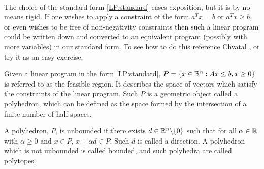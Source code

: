 \paragraph{}The choice of the standard form \ref{LP:standard} eases exposition, but it is by no means rigid. If one wishes to apply a constraint of the form $a^T x = b$ or $a^T x \geq b$, or even wishes to be free of non-negativity constraints then such a linear program could be written down and converted to an equivalent program (possibly with more variables) in our standard form. To see how to do this reference Chvatal \cite{chvatal1983linear}, or try it as an easy exercise.
\begin{definition} Given a linear program in the form \ref{LP:standard}, $P = \{ x \in \mathbb{R}^n: Ax \leq b, x \geq 0 \}$ is referred to as the feasible region. It describes the space of vectors which satisfy the constraints of the linear program. Such $P$ is a geometric object called a polyhedron, which can be defined as the space formed by the intersection of a finite number of half-spaces.
\end{definition}
\begin{definition}
 A polyhedron, $P$, is unbounded if there exists $d \in \mathbb{R}^n\backslash \{0\}$ such that for all $\alpha \in \mathbb{R}$ with $\alpha \geq 0$ and $x \in P$, $x + \alpha d \in P$. Such $d$ is called a direction. A polyhedron which is not unbounded is called bounded, and such polyhedra are called polytopes. 
\end{definition}
